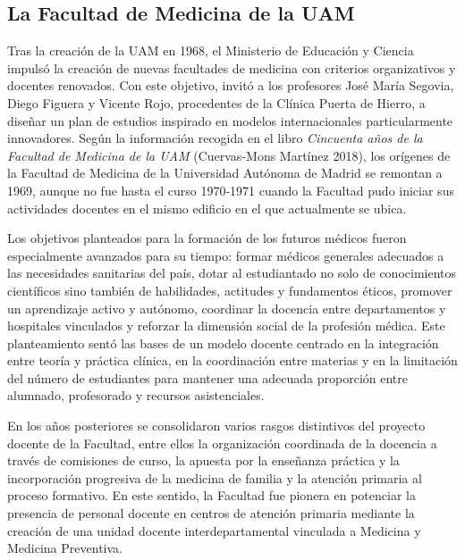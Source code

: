 \documentclass[
  11pt,
  a4paper,
  twoside]{scrreprt}
\begin{document}
\subsection{La Facultad de Medicina de la
UAM}\label{la-facultad-de-medicina-de-la-uam}

Tras la creación de la UAM en 1968, el Ministerio de Educación y Ciencia
impulsó la creación de nuevas facultades de medicina con criterios
organizativos y docentes renovados. Con este objetivo, invitó a los
profesores José María Segovia, Diego Figuera y Vicente Rojo, procedentes
de la Clínica Puerta de Hierro, a diseñar un plan de estudios inspirado
en modelos internacionales particularmente innovadores. Según la
información recogida en el libro \emph{Cincuenta años de la Facultad de
Medicina de la UAM} (Cuervas-Mons Martínez 2018), los orígenes de la
Facultad de Medicina de la Universidad Autónoma de Madrid se remontan a
1969, aunque no fue hasta el curso 1970‑1971 cuando la Facultad pudo
iniciar sus actividades docentes en el mismo edificio en el que
actualmente se ubica.

Los objetivos planteados para la formación de los futuros médicos fueron
especialmente avanzados para su tiempo: formar médicos generales
adecuados a las necesidades sanitarias del país, dotar al estudiantado
no solo de conocimientos científicos sino también de habilidades,
actitudes y fundamentos éticos, promover un aprendizaje activo y
autónomo, coordinar la docencia entre departamentos y hospitales
vinculados y reforzar la dimensión social de la profesión médica. Este
planteamiento sentó las bases de un modelo docente centrado en la
integración entre teoría y práctica clínica, en la coordinación entre
materias y en la limitación del número de estudiantes para mantener una
adecuada proporción entre alumnado, profesorado y recursos
asistenciales.

En los años posteriores se consolidaron varios rasgos distintivos del
proyecto docente de la Facultad, entre ellos la organización coordinada
de la docencia a través de comisiones de curso, la apuesta por la
enseñanza práctica y la incorporación progresiva de la medicina de
familia y la atención primaria al proceso formativo. En este sentido, la
Facultad fue pionera en potenciar la presencia de personal docente en
centros de atención primaria mediante la creación de una unidad docente
interdepartamental vinculada a Medicina y Medicina Preventiva.
\end{document}
